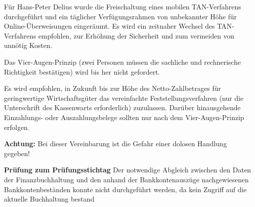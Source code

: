 \documentclass[%
	titlepage,oneside,12pt,headlines=1.5,numbers=noenddot, chapterprefix=false,parskip=full-,DIV=14,pagesize]{scrreprt}
\newcommand*{\Achtung}[1]{\textbf{Achtung:} #1}
\begin{document}
Für Hans-Peter Delius wurde die Freischaltung eines mobilen TAN-Verfahrens durchgeführt und ein täglicher Verfügungsrahmen von unbekannter Höhe für Online-Überweisungen eingeräumt. Es wird ein zeitnaher Wechsel des TAN-Verfahrens empfohlen, zur Erhöhung der Sicherheit und zum vermeiden von unnötig Kosten.

Das Vier-Augen-Prinzip (zwei Personen müssen die sachliche und rechnerische Richtigkeit bestätigen) wird bis her nicht gefordert.

Es wird empfohlen, in Zukunft bis zur Höhe des Netto-Zahlbetrages für geringwertige Wirtschaftsgüter das vereinfachte Feststellungsverfahren (nur die Unterschrift des Kassenwarts erforderlich) zuzulassen. Darüber hinausgehende Einzahlungs- oder Auszahlungsbelege sollten nur nach dem Vier-Augen-Prinzip erfolgen.

\Achtung{Bei dieser Vereinbarung ist die Gefahr einer dolosen Handlung gegeben!}

\textbf{Prüfung zum Prüfungsstichtag}\newline
Der notwendige Abgleich zwischen den Daten der Finanzbuchhaltung und den anhand der Bankkontenauszüge nachgewiesenen Bankkontenbeständen konnte nicht durchgeführt werden, da kein Zugriff auf die aktuelle Buchhaltung bestand
\end{document}

